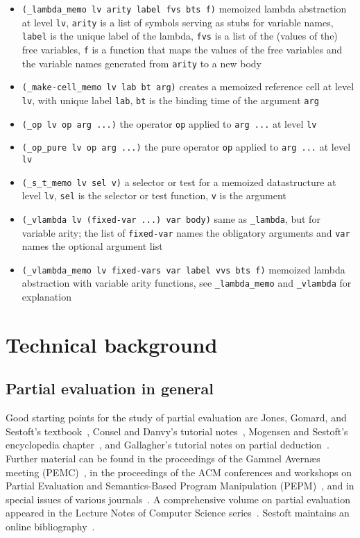 \documentclass[11pt]{article}
\begin{document}
\begin{itemize}
\item \verb!(_lambda_memo lv arity label fvs bts f)! memoized lambda
  abstraction at level \texttt{lv}, \texttt{arity} is a list of
  symbols serving as stubs for variable names, \texttt{label} is the
  unique label of the lambda, \texttt{fvs} is a list of  the (values
  of the) free variables, \texttt{f} is a function that maps the
  values of the free variables and the variable names generated from
  \texttt{arity} to a new body
\item \verb!(_make-cell_memo lv lab bt arg)! creates a memoized
  reference cell at level \texttt{lv}, with unique label \texttt{lab},
  \texttt{bt} is the binding time of the argument \texttt{arg}
\item \verb!(_op lv op arg ...)! the operator \texttt{op} applied to
  \texttt{arg ...} at level \texttt{lv}
\item \verb!(_op_pure lv op arg ...)! the pure operator \texttt{op}
  applied to \texttt{arg ...} at level \texttt{lv}
\item \verb!(_s_t_memo lv sel v)! a selector or test for a memoized
  datastructure at level \texttt{lv}, \texttt{sel} is the selector or
  test function, \texttt{v} is the argument
\item \verb!(_vlambda lv (fixed-var ...) var body)! same as
  \verb!_lambda!, but for variable arity; the list of
  \texttt{fixed-var} names the obligatory arguments and \texttt{var}
  names the optional argument list
\item \verb!(_vlambda_memo lv fixed-vars var label vvs bts f)! memoized lambda
  abstraction with variable  arity functions, see
  \verb!_lambda_memo! and \verb!_vlambda! for explanation
\end{itemize}

\section{Technical background}
\label{sec:background}


\subsection{Partial evaluation in general}
\label{sec:partial-evaluation}


Good starting points for the study of partial evaluation are
Jones, Gomard, and Sestoft's textbook~\cite{JonesGomardSestoft1993},
Consel and Danvy's tutorial notes~\cite{ConselDanvy1993}, Mogensen and
Sestoft's encyclopedia chapter~\cite{MogensenSestoft1997},
and Gallagher's tutorial notes on partial
deduction~\cite{Gallagher1993}. Further material can be found in
the proceedings of the Gammel Avern{\ae}s
meeting (PEMC)~\cite{PEMC1988,PEMC1988-ngc}, in the
proceedings of the ACM conferences and workshops on Partial Evaluation and
Semantics-Based Program Manipulation
(PEPM)~\cite{PEPM1991,PEPM1992,PEPM1993,PEPM1994,PEPM1995,PEPM1997,PEPM1999},
and in special issues of various
journals~\cite{jfpspecial1993,jlpspecial1993,lascspecial1995,tcsspecial1998}. A
comprehensive volume on partial evaluation appeared in the Lecture
Notes of Computer Science series~\cite{PE1996}.  Sestoft maintains
an online bibliography~\cite{pebibliography}.
\end{document}
